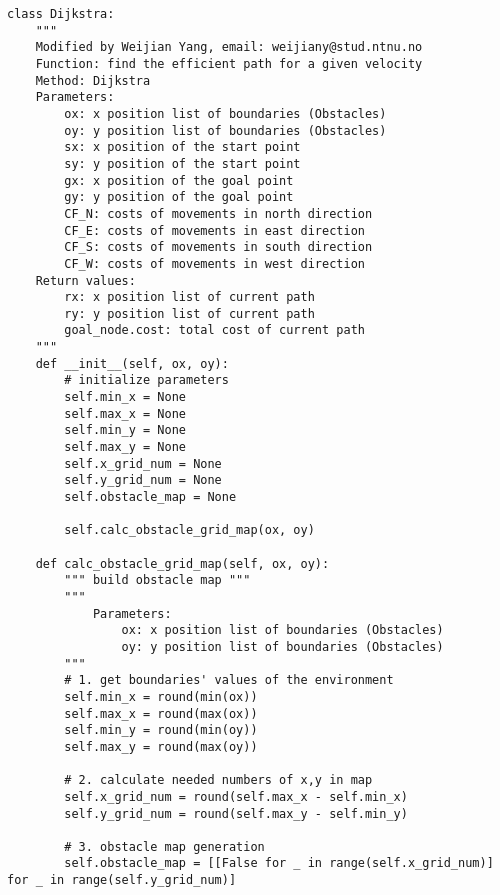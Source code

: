 \begin{lstlisting}[caption=Function for finding the efficient path under a given speed (\autoref{Pathfinding}), label=moddijk]
class Dijkstra:
    """     
    Modified by Weijian Yang, email: weijiany@stud.ntnu.no
    Function: find the efficient path for a given velocity
    Method: Dijkstra          
    Parameters:
        ox: x position list of boundaries (Obstacles)
        oy: y position list of boundaries (Obstacles)
        sx: x position of the start point
        sy: y position of the start point
        gx: x position of the goal point
        gy: y position of the goal point
        CF_N: costs of movements in north direction
        CF_E: costs of movements in east direction
        CF_S: costs of movements in south direction
        CF_W: costs of movements in west direction
    Return values:
        rx: x position list of current path
        ry: y position list of current path
        goal_node.cost: total cost of current path
    """  
    def __init__(self, ox, oy):
        # initialize parameters
        self.min_x = None
        self.max_x = None
        self.min_y = None
        self.max_y = None
        self.x_grid_num = None
        self.y_grid_num = None
        self.obstacle_map = None

        self.calc_obstacle_grid_map(ox, oy) 

    def calc_obstacle_grid_map(self, ox, oy):
        """ build obstacle map """
        """             
            Parameters:
                ox: x position list of boundaries (Obstacles)
                oy: y position list of boundaries (Obstacles)
        """
        # 1. get boundaries' values of the environment
        self.min_x = round(min(ox))
        self.max_x = round(max(ox))
        self.min_y = round(min(oy))
        self.max_y = round(max(oy))

        # 2. calculate needed numbers of x,y in map
        self.x_grid_num = round(self.max_x - self.min_x)
        self.y_grid_num = round(self.max_y - self.min_y)

        # 3. obstacle map generation
        self.obstacle_map = [[False for _ in range(self.x_grid_num)] for _ in range(self.y_grid_num)]


\end{lstlisting}
